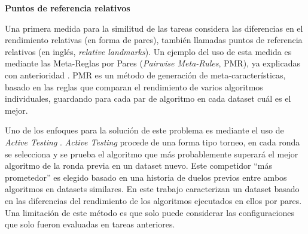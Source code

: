 \quad 

\textbf{Puntos de referencia relativos}


\quad

Una primera medida para la similitud de las tareas considera las diferencias en el rendimiento relativas (en forma de pares), también llamadas puntos de referencia relativos (en inglés, \textit{relative landmarks}). Un ejemplo del uso de esta medida es mediante las Meta-Reglas por Pares (\textit{Pairwise Meta-Rules}, PMR), ya explicadas con anterioridad \cite{sun2013pairwise}. PMR es un método de generación de meta-características, basado en las reglas que comparan el rendimiento de varios algoritmos individuales, guardando para cada par de algoritmo en cada dataset cuál es el mejor.

Uno de los enfoques para la solución de este problema es mediante el uso de \textit{Active Testing} \cite{leite2017selecting}. \textit{Active Testing} procede de una forma tipo torneo, en cada ronda se selecciona y se prueba el algoritmo que más probablemente superará el mejor algoritmo de la ronda previa en un dataset nuevo. Este competidor ``más prometedor'' es elegido basado en una historia de duelos previos entre ambos algoritmos en datasets similares. En este trabajo \cite{leite2017selecting} caracterizan un dataset basado en las diferencias del rendimiento de los algoritmos ejecutados en ellos por pares. Una limitación de este método es que solo puede considerar las configuraciones que solo fueron evaluadas en tareas anteriores.

